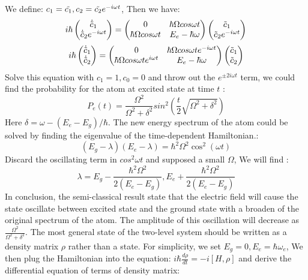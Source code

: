 \documentclass[11pt]{article}
\begin{document}
We define: $c_1 = \Tilde{c_1} , c_2 = \Tilde{c_2} e^{-i \omega t}$, Then we have: 
$$
i\hbar \begin{pmatrix}
    \Dot{\Tilde{c}}_1 \\
    \Dot{\Tilde{c}}_2 e^{-i\omega t}
\end{pmatrix}= \begin{pmatrix}
    0 & \hbar \Omega cos\omega t \\
    \hbar \Omega cos\omega t & E_e - \hbar \omega \\
\end{pmatrix} \begin{pmatrix}
    \Tilde{c}_1  \\
    \Tilde{c}_2 e^{-i\omega t} 
\end{pmatrix}
$$
$$
i\hbar \begin{pmatrix}
    \Dot{\Tilde{c}}_1 \\
    \Dot{\Tilde{c}}_2 
\end{pmatrix}= \begin{pmatrix}
    0 & \hbar \Omega cos\omega t e^{-i \omega t}\\
    \hbar \Omega cos\omega t e^{i\omega t}& E_e - \hbar \omega \\
\end{pmatrix} \begin{pmatrix}
    \Tilde{c}_1  \\
    \Tilde{c}_2  
\end{pmatrix}
$$
Solve this equation with $c_1=1, c_0=0$ and throw out the $e^{\pm 2 i\omega t}$ term, we could find the probability for the atom at excited state at time $t$ : 
$$
P_e(t) = \frac{\Omega^2}{\Omega^2 + \delta^2} sin^2(\frac{t}{2} \sqrt{\Omega^2 + \delta^2})
$$
Here $\delta = \omega -(E_e - E_g)/\hbar$. The new energy spectrum of the atom could be solved by finding the eigenvalue of the time-dependent Hamiltonian.:
$$
(E_g-\lambda)(E_e - \lambda) = \hbar^2\Omega^2 \cos^2(\omega t)
$$
Discard the oscillating term in $cos^2\omega t$ and supposed a small $\Omega$, We will find :
$$\lambda = E_g - \frac{\hbar^2 \Omega^2}{2(E_e - E_g)}, E_e + \frac{\hbar^2 \Omega^2}{2(E_e - E_g)}$$
In conclusion, the semi-classical result state that the electric field will cause the state oscillate between excited state and the ground state with a broaden of the original spectrum of  the atom. The amplitude of this oscillation will decrease as $\frac{\Omega^2}{\Omega^2 + \delta^2}$. 
The most general state of the two-level system should be written as a density matrix $\rho$ rather than a state. For simplicity, we set $E_g =0, E_e = \hbar \omega_e$, We then plug the Hamiltonian into the equation: $i\hbar \frac{d\rho}{dt} =-i[H,\rho] $ and derive the differential equation of terms of density matrix:
\end{document}
